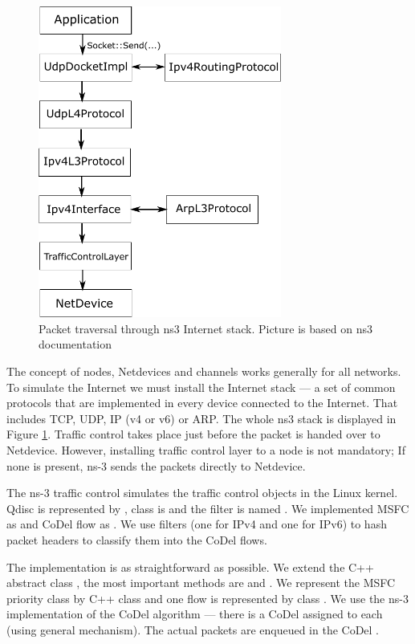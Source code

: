 \begin{figure}
	\centering
	\includegraphics[width=80mm]{drawings/ns3_internet_stack}
	\captionsetup{justification=centering}
	\caption{Packet traversal through ns3 Internet stack. Picture is based on ns3 documentation \cite[p. 88]{ns3Doc}}
	\label{fig13:ns3}
\end{figure}

The concept of nodes, Netdevices and channels works generally for all networks. To simulate the Internet we must install the Internet stack --- a set of common protocols that are implemented in every device connected to the Internet. That includes TCP, UDP, IP (v4 or v6) or ARP. The whole ns3 stack is displayed in Figure \ref{fig13:ns3}. Traffic control takes place just before the packet is handed over to Netdevice. However, installing traffic control layer to a node is not mandatory; If none is present, ns-3 sends the packets directly to Netdevice.

The ns-3 traffic control simulates the traffic control objects in the Linux kernel. Qdisc is represented by , class is  and the filter is named . We implemented MSFC as  and CoDel flow as . We use filters (one for IPv4 and one for IPv6) to hash packet headers to classify them into the CoDel flows.

The implementation is as straightforward as possible. We extend the C++ abstract class , the most important methods are  and . We represent the MSFC priority class by C++ class  and one flow is represented by class . We use the ns-3 implementation of the CoDel algorithm --- there is a CoDel  assigned to each  (using general  mechanism). The actual packets are enqueued in the CoDel .

